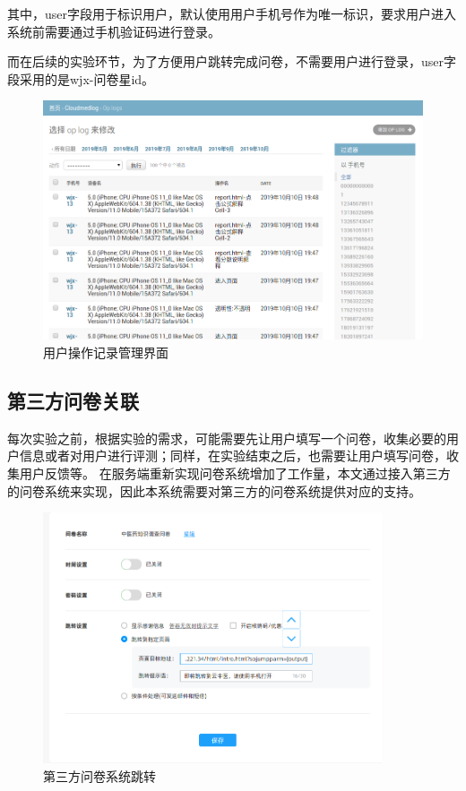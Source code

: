 其中，user字段用于标识用户，默认使用用户手机号作为唯一标识，要求用户进入系统前需要通过手机验证码进行登录。

而在后续的实验环节，为了方便用户跳转完成问卷，不需要用户进行登录，user字段采用的是wjx-问卷星id。

\begin{figure}[ht]
    \centering
    \includegraphics[width=12cm]{images/op_log.png}
    \caption{用户操作记录管理界面}
    \label{fig:op_log}
\end{figure}

\subsection{第三方问卷关联}
每次实验之前，根据实验的需求，可能需要先让用户填写一个问卷，收集必要的用户信息或者对用户进行评测；同样，在实验结束之后，也需要让用户填写问卷，收集用户反馈等。
在服务端重新实现问卷系统增加了工作量，本文通过接入第三方的问卷系统来实现，因此本系统需要对第三方的问卷系统提供对应的支持。


\begin{figure}[h]
    \centering
    \includegraphics[width=10cm]{images/wjx1.png}
    \caption{第三方问卷系统跳转}
    \label{fig:wjx-ssojump}
\end{figure}

